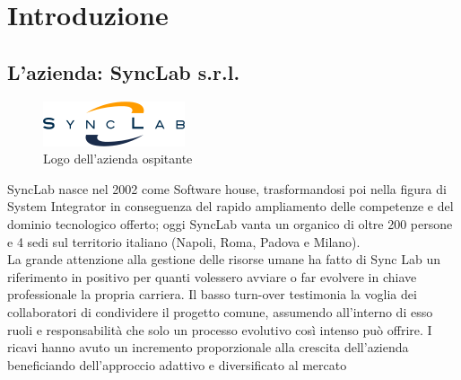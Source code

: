 
\chapter{Introduzione}
\label{cap:introduzione}






\section{L'azienda: SyncLab s.r.l.}


\begin{figure}[!h] 
	\centering 
	\includegraphics[width=0.25\columnwidth]{immagini/logo_azienda} 
	\caption{Logo dell'azienda ospitante}
	\label{figura:logo-azienda}
\end{figure} 
SyncLab nasce nel 2002 come Software house, trasformandosi poi nella figura di \gls{System Integrator} in conseguenza del rapido ampliamento delle competenze e del dominio tecnologico offerto; oggi SyncLab vanta un organico di oltre 200 persone e 4 sedi sul territorio italiano (Napoli, Roma, Padova e Milano).\\
La grande attenzione alla gestione delle risorse umane ha fatto di Sync Lab un
riferimento in positivo per quanti volessero avviare o far evolvere in chiave professionale
la propria carriera.
Il basso turn-over testimonia la voglia dei collaboratori di condividere il progetto
comune, assumendo all’interno di esso ruoli e responsabilità che solo un processo
evolutivo così intenso può offrire.
I ricavi hanno avuto un incremento proporzionale alla crescita dell’azienda beneficiando
dell’approccio adattivo e diversificato al mercato



